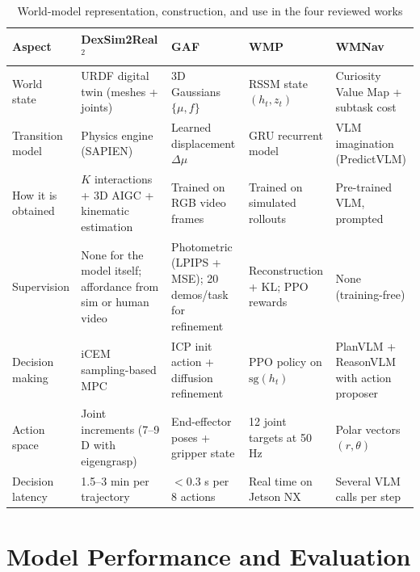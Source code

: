 \documentclass[12pt,a4paper,final]{extreport}
\begin{document}
{\renewcommand{\arraystretch}{1.35}
\begin{table}[htbp]
\centering
\caption{World-model representation, construction, and use in the four reviewed works}\label{tab:repr}
\footnotesize
\begin{tabularx}{\textwidth}{|p{2.35cm}|X|X|X|X|}
\hline
\textbf{Aspect} & \textbf{DexSim2Real$^2$} & \textbf{GAF} & \textbf{WMP} & \textbf{WMNav} \\ \hline
World state & URDF digital twin (meshes + joints) & 3D Gaussians $\{\mu,f\}$ & RSSM state $(h_t,z_t)$ & Curiosity Value Map + subtask cost \\ \hline
Transition model & Physics engine (SAPIEN) & Learned displacement $\Delta\mu$ & GRU recurrent model & VLM imagination (PredictVLM) \\ \hline
How it is obtained & $K$ interactions + 3D AIGC + kinematic estimation & Trained on RGB video frames & Trained on simulated rollouts & Pre-trained VLM, prompted \\ \hline
Supervision & None for the model itself; affordance from sim or human video & Photometric (LPIPS + MSE); 20 demos/task for refinement & Reconstruction + KL; PPO rewards & None (training-free) \\ \hline
Decision making & iCEM sampling-based MPC & ICP init action + diffusion refinement & PPO policy on $\mathrm{sg}(h_t)$ & PlanVLM + ReasonVLM with action proposer \\ \hline
Action space & Joint increments (7--9 D with eigengrasp) & End-effector poses + gripper state & 12 joint targets at 50 Hz & Polar vectors $(r,\theta)$ \\ \hline
Decision latency & 1.5--3 min per trajectory & $<$0.3 s per 8 actions & Real time on Jetson NX & Several VLM calls per step \\ \hline
\end{tabularx}
\end{table}}

\section{Model Performance and Evaluation}
\end{document}
